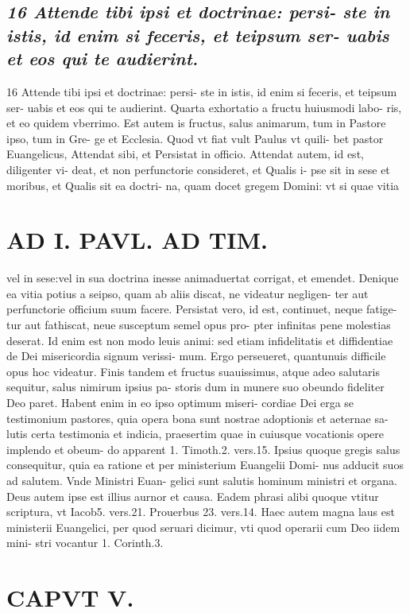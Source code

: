 \documentclass{article}
\begin{document}
\begin{pages}
\subsection*{\textit{16 Attende tibi ipsi et doctrinae: persi- ste in istis, id enim si feceris, et teipsum ser- uabis et eos qui te audierint.}}16 Attende tibi ipsi et doctrinae: persi- ste in istis, id enim si feceris, et teipsum ser- uabis et eos qui te audierint. Quarta exhortatio a fructu huiusmodi labo- ris, et eo quidem vberrimo. Est autem is fructus, salus animarum, tum in Pastore ipso, tum in Gre- ge et Ecclesia. Quod vt fiat vult Paulus vt quili- bet pastor Euangelicus, Attendat sibi, et Persistat in officio. Attendat autem, id est, diligenter vi- deat, et non perfunctorie consideret, et Qualis i- pse sit in sese et moribus, et Qualis sit ea doctri- na, quam docet gregem Domini: vt si quae vitia  \pend
\section*{AD I. PAVL. AD TIM. }
\marginpar{[ p.238 ]}\pstart vel in sese:vel in sua doctrina inesse animaduertat corrigat, et emendet. Denique ea vitia potius a seipso, quam ab aliis discat, ne videatur negligen- ter aut perfunctorie officium suum facere. Persistat vero, id est, continuet, neque fatige- tur aut fathiscat, neue susceptum semel opus pro- pter infinitas pene molestias deserat. Id enim est non modo leuis animi: sed etiam infidelitatis et diffidentiae de Dei misericordia signum verissi- mum. Ergo perseueret, quantunuis difficile opus hoc videatur. Finis tandem et fructus suauissimus, atque adeo salutaris sequitur, salus nimirum ipsius pa- storis dum in munere suo obeundo fideliter Deo paret. Habent enim in eo ipso optimum miseri- cordiae Dei erga se testimonium pastores, quia opera bona sunt nostrae adoptionis et aeternae sa- lutis certa testimonia et indicia, praesertim quae in cuiusque vocationis opere implendo et obeum- do apparent 1. Timoth.2. vers.15. Ipsius quoque gregis salus consequitur, quia ea ratione et per ministerium Euangelii Domi- nus adducit suos ad salutem. Vnde Ministri Euan- gelici sunt salutis hominum ministri et organa. Deus autem ipse est illius aurnor et causa. Eadem phrasi alibi quoque vtitur scriptura, vt Iacob5. vers.21. Prouerbus 23. vers.14. Haec autem magna laus est ministerii Euangelici, per quod seruari dicimur, vti quod operarii cum Deo iidem mini- stri vocantur 1. Corinth.3.  \pend
\section{CAPVT  V. }
\marginpar{[ p.239 ]}\pstart {}
{}

\end{pages}
\end{document}
